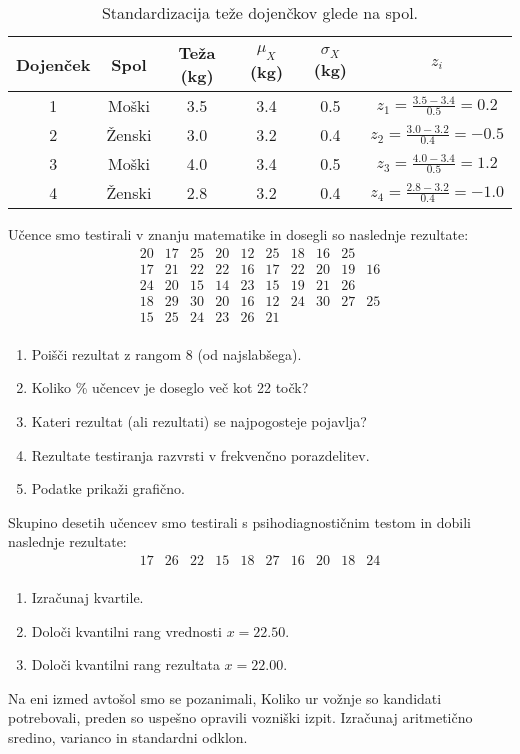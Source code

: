 \begin{table}[h!]
    \centering
    \begin{tabular}{cccccc}
    \toprule
    Dojenček & Spol & Teža (kg) & $\mu_X$ (kg) & $\sigma_X$ (kg) & $z_i$ \\
    \midrule
    1 & Moški & 3.5 & 3.4 & 0.5 & $z_1 = \frac{3.5 - 3.4}{0.5} = 0.2$ \\
    2 & Ženski & 3.0 & 3.2 & 0.4 & $z_2 = \frac{3.0 - 3.2}{0.4} = -0.5$ \\
    3 & Moški & 4.0 & 3.4 & 0.5 & $z_3 = \frac{4.0 - 3.4}{0.5} = 1.2$ \\
    4 & Ženski & 2.8 & 3.2 & 0.4 & $z_4 = \frac{2.8 - 3.2}{0.4} = -1.0$ \\
    \bottomrule
    \end{tabular}
    \caption{Standardizacija teže dojenčkov glede na spol.}
\end{table}

\begin{Vaje}{1}
    Učence smo testirali v znanju matematike in dosegli so naslednje rezultate:
\[
\begin{array}{cccccccccccccc}
20 & 17 & 25 & 20 & 12 & 25 & 18 & 16 & 25 \\
17 & 21 & 22 & 22 & 16 & 17 & 22 & 20 & 19 & 16 \\
24 & 20 & 15 & 14 & 23 & 15 & 19 & 21 & 26 \\
18 & 29 & 30 & 20 & 16 & 12 & 24 & 30 & 27 & 25 \\
15 & 25 & 24 & 23 & 26 & 21 \\
\end{array}
\]

\begin{enumerate}
\item Poišči rezultat z rangom 8 (od najslabšega).
\item Koliko \% učencev je doseglo več kot 22 točk?
\item Kateri rezultat (ali rezultati) se najpogosteje pojavlja?
\item Rezultate testiranja razvrsti v frekvenčno porazdelitev.
\item Podatke prikaži grafično.
\end{enumerate}
\end{Vaje}

\begin{Vaje}{2} 
        Skupino desetih učencev smo testirali s psihodiagnostičnim testom in dobili naslednje rezultate:
        \[
        \begin{array}{cccccccccc}
        17 & 26 & 22 & 15 & 18 & 27 & 16 & 20 & 18 & 24 \\
        \end{array}
        \]
        
        \begin{enumerate}
            \item Izračunaj kvartile.
            \item Določi kvantilni rang vrednosti $x = 22.50$.
            \item Določi kvantilni rang rezultata $x = 22.00$.
        \end{enumerate}
\end{Vaje}

\begin{Vaje}{3}
    Na eni izmed avtošol smo se pozanimali, Koliko ur vožnje so kandidati potrebovali, preden so uspešno opravili vozniški izpit. Izračunaj aritmetično sredino, varianco in standardni odklon.
\end{Vaje}